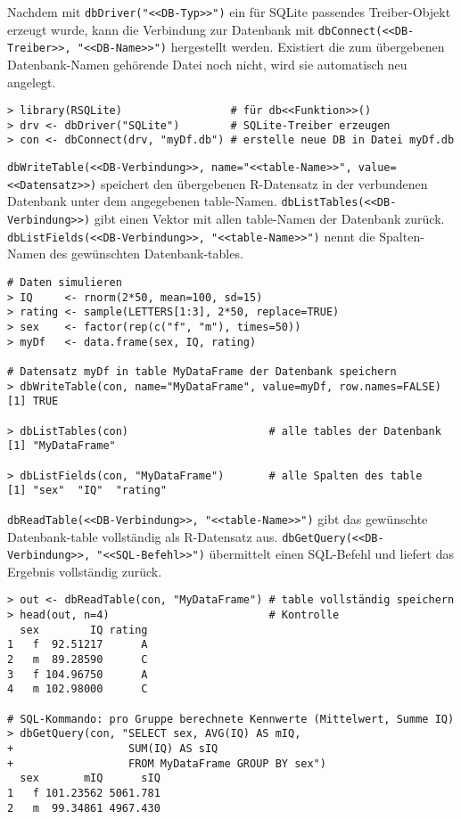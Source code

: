 Nachdem mit \lstinline!dbDriver("<<DB-Typ>>")! ein für SQLite passendes Treiber-Objekt erzeugt wurde, kann die Verbindung zur Datenbank mit \lstinline!dbConnect(<<DB-Treiber>>, "<<DB-Name>>")! hergestellt werden. Existiert die zum übergebenen Datenbank-Namen gehörende Datei noch nicht, wird sie automatisch neu angelegt.
\begin{lstlisting}
> library(RSQLite)                 # für db<<Funktion>>()
> drv <- dbDriver("SQLite")        # SQLite-Treiber erzeugen
> con <- dbConnect(drv, "myDf.db") # erstelle neue DB in Datei myDf.db
\end{lstlisting}

\lstinline!dbWriteTable(<<DB-Verbindung>>, name="<<table-Name>>", value=<<Datensatz>>)! speichert den übergebenen R-Datensatz in der verbundenen Datenbank unter dem angegebenen table-Namen. \lstinline!dbListTables(<<DB-Verbindung>>)! gibt einen Vektor mit allen table-Namen der Datenbank zurück. \lstinline!dbListFields(<<DB-Verbindung>>, "<<table-Name>>")! nennt die Spalten-Namen des gewünschten Datenbank-tables.
\begin{lstlisting}
# Daten simulieren
> IQ     <- rnorm(2*50, mean=100, sd=15)
> rating <- sample(LETTERS[1:3], 2*50, replace=TRUE)
> sex    <- factor(rep(c("f", "m"), times=50))
> myDf   <- data.frame(sex, IQ, rating)

# Datensatz myDf in table MyDataFrame der Datenbank speichern
> dbWriteTable(con, name="MyDataFrame", value=myDf, row.names=FALSE)
[1] TRUE

> dbListTables(con)                      # alle tables der Datenbank
[1] "MyDataFrame"

> dbListFields(con, "MyDataFrame")       # alle Spalten des table
[1] "sex"  "IQ"  "rating"
\end{lstlisting}

\lstinline!dbReadTable(<<DB-Verbindung>>, "<<table-Name>>")! gibt das gewünschte Datenbank-table vollständig als R-Datensatz aus. \lstinline!dbGetQuery(<<DB-Verbindung>>, "<<SQL-Befehl>>")! übermittelt einen SQL-Befehl und liefert das Ergebnis vollständig zurück.
\begin{lstlisting}
> out <- dbReadTable(con, "MyDataFrame") # table vollständig speichern
> head(out, n=4)                         # Kontrolle
  sex        IQ rating
1   f  92.51217      A
2   m  89.28590      C
3   f 104.96750      A
4   m 102.98000      C

# SQL-Kommando: pro Gruppe berechnete Kennwerte (Mittelwert, Summe IQ)
> dbGetQuery(con, "SELECT sex, AVG(IQ) AS mIQ,
+                  SUM(IQ) AS sIQ
+                  FROM MyDataFrame GROUP BY sex")
  sex       mIQ      sIQ
1   f 101.23562 5061.781
2   m  99.34861 4967.430
\end{lstlisting}

